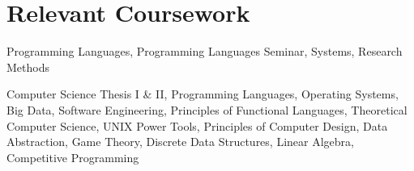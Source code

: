 \section{Relevant Coursework}

%
{}%
{}%
{}%
{Programming Languages, Programming Languages Seminar, Systems, Research
Methods%
\newline{}
}

%
{}%
{}%
{}%
{Computer Science Thesis I \& II, Programming Languages, Operating Systems, Big
Data, Software Engineering, Principles of Functional Languages, Theoretical
Computer Science, UNIX Power Tools, Principles of Computer Design, Data
Abstraction, Game Theory, Discrete Data Structures, Linear Algebra, Competitive
Programming
\newline{}
}
